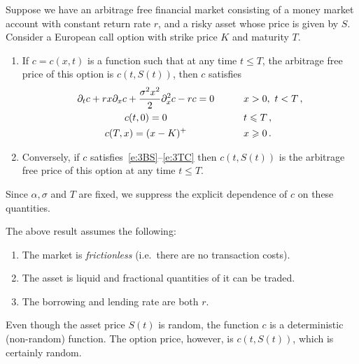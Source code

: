 \begin{theorem}\label{t:3bsm}
  Suppose we have an arbitrage free financial market consisting of a money market account with constant return rate $r$, and a risky asset whose price is given by $S$.
  Consider a European call option with strike price $K$ and maturity $T$.
  \begin{enumerate}
    \item\label{p:3bsm1}
      If $c = c(x, t)$ is a function such that at any time $t \leq T$, the arbitrage free price of this option is $c(t, S(t))$, then $c$ satisfies
      \begin{alignat}{2}
	\span\label{e:3BS}
	  \partial_t c + r x \partial_x c + \frac{\sigma^2 x^2}{2} \partial_x^2 c - r c
	  = 0
	  &\qquad& x > 0,\ t < T\,,
	\\
	\span\label{e:3cBC}
	  c(t, 0) = 0
	  && t \leq T\,,
	\\
	\span\label{e:3TC}
	  c(T, x) = (x - K)^+
	  && x \geq 0\,.
      \end{alignat}

    \item\label{p:3bsm2}
      Conversely, if $c$ satisfies~\eqref{e:3BS}--\eqref{e:3TC} then $c(t, S(t))$ is the arbitrage free price of this option at any time $t \leq T$.
  \end{enumerate}
\end{theorem}
\begin{remark}
  Since $\alpha, \sigma$ and $T$ are fixed, we suppress the explicit dependence of $c$ on these quantities.
\end{remark}
\begin{remark}
  The above result assumes the following:
  \begin{enumerate}
    \item
      The market is \emph{frictionless} (i.e.\ there are no transaction costs).
    \item
      The asset is liquid and fractional quantities of it can be traded.
    \item
      The borrowing and lending rate are both $r$.
  \end{enumerate}
\end{remark}
\begin{remark}
  Even though the asset price $S(t)$ is random, the function $c$ is a deterministic (non-random) function.
  The option price, however, is $c(t, S(t))$, which is certainly random.
\end{remark}
